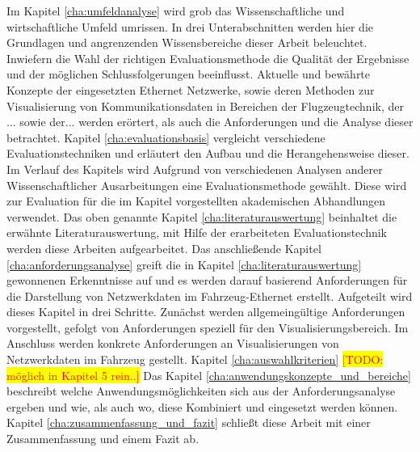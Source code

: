 \documentclass[draft=false
              ,paper=a4
              ,twoside=false
              ,fontsize=11pt
              ,headsepline
              ,BCOR10mm
              ,DIV11
              ]{scrbook}
\newcommand{\TODO}[1]{\colorbox{yellow}{\textcolor{red}{[TODO: #1]}}}
\begin{document}
Im Kapitel \ref{cha:umfeldanalyse} wird grob das Wissenschaftliche und wirtschaftliche Umfeld umrissen. In drei Unterabschnitten werden hier die Grundlagen und angrenzenden Wissensbereiche dieser Arbeit beleuchtet. Inwiefern die Wahl der richtigen Evaluationsmethode die Qualität der Ergebnisse und der möglichen Schlussfolgerungen beeinflusst. Aktuelle und bewährte Konzepte der eingesetzten Ethernet Netzwerke, sowie deren Methoden zur Visualisierung von Kommunikationsdaten in Bereichen der Flugzeugtechnik, der ... sowie der... werden erörtert, als auch die Anforderungen und die Analyse dieser betrachtet. 
Kapitel \ref{cha:evaluationsbasis} vergleicht verschiedene Evaluationstechniken und erläutert den Aufbau und die Herangehensweise dieser. Im Verlauf des Kapitels wird Aufgrund von verschiedenen Analysen anderer Wissenschaftlicher Ausarbeitungen eine Evaluationsmethode gewählt. Diese wird zur Evaluation für die im Kapitel  vorgestellten akademischen Abhandlungen verwendet. Das oben genannte Kapitel \ref{cha:literaturauswertung} beinhaltet die erwähnte Literaturauswertung, mit Hilfe der erarbeiteten Evaluationstechnik werden diese Arbeiten aufgearbeitet. Das anschließende Kapitel \ref{cha:anforderungsanalyse} greift die in Kapitel \ref{cha:literaturauswertung} gewonnenen Erkenntnisse auf und es werden darauf basierend Anforderungen für die Darstellung von Netzwerkdaten im Fahrzeug-Ethernet erstellt. Aufgeteilt wird dieses Kapitel in drei Schritte. Zunächst werden allgemeingültige Anforderungen vorgestellt, gefolgt von Anforderungen speziell für den Visualisierungsbereich. Im Anschluss werden konkrete Anforderungen an Visualisierungen von Netzwerkdaten im Fahrzeug gestellt. Kapitel \ref{cha:auswahlkriterien} \TODO{möglich in Kapitel 5 rein..}
Das Kapitel \ref{cha:anwendungskonzepte_und_bereiche} beschreibt welche Anwendungsmöglichkeiten sich aus der Anforderungsanalyse ergeben und wie, als auch wo, diese Kombiniert und eingesetzt werden können. Kapitel \ref{cha:zusammenfassung_und_fazit} schließt diese Arbeit mit einer Zusammenfassung und einem Fazit ab.
\end{document}
